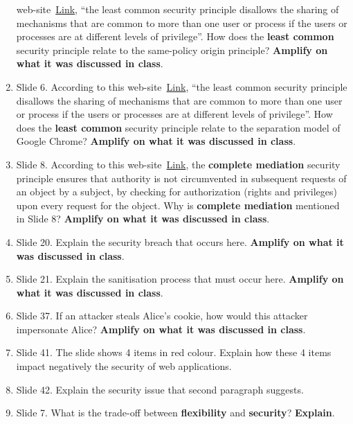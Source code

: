 \documentclass{article}
\begin{document}
\begin{enumerate}
  web-site~\href{https://owasp.org/www-project-developer-guide/draft/foundations/security_principles}{Link},
  ``the least common security principle disallows the sharing of
  mechanisms that are common to more than one user or process if the
  users or processes are at different levels of privilege''. How does
  the \textbf{least common} security principle relate to the same-policy origin
  principle? \textbf{Amplify on what it was discussed in class}.
%
\item Slide 6. According to this
  web-site~\href{https://owasp.org/www-project-developer-guide/draft/foundations/security_principles}{Link},
  ``the least common security principle disallows the sharing of
  mechanisms that are common to more than one user or process if the
  users or processes are at different levels of privilege''. How does
  the \textbf{least common} security principle relate to the separation model
  of Google Chrome? \textbf{Amplify on what it was discussed in class}.
%
\item Slide 8. According to this
  web-site~\href{https://owasp.org/www-project-developer-guide/draft/foundations/security_principles}{Link},
  the \textbf{complete mediation} security principle ensures that
  authority is not circumvented in subsequent requests of an object by
  a subject, by checking for authorization (rights and privileges)
  upon every request for the object. Why is \textbf{complete
    mediation} mentioned in Slide 8? \textbf{Amplify on what it was discussed in class}.
\item Slide 20. Explain the security breach that occurs 
  here.  \textbf{Amplify on what it was discussed in class}.
\item Slide 21. Explain the sanitisation process that must occur here.
  \textbf{Amplify on what it was discussed in class}.
\item Slide 37. If an attacker steals Alice's cookie, how would this
  attacker impersonate Alice?  \textbf{Amplify on what it was
    discussed in class}.
\item Slide 41. The slide shows 4 items in red colour. Explain how
  these 4 items impact negatively the security of web applications.
\item Slide 42. Explain the security issue that second paragraph
  suggests.  
\item Slide 7. What is the trade-off between \textbf{flexibility}
  and \textbf{security}? \textbf{Explain}.
\end{enumerate}  
\end{document}
